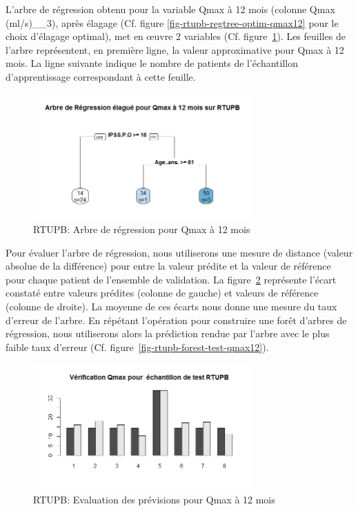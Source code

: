 L'arbre de régression obtenu pour la variable Qmax à 12 mois (colonne Qmax (ml/s)\_\_3), après élagage (Cf. figure \ref{fig-rtupb-regtree-optim-qmax12} pour le choix d'élagage optimal), met en {\oe}uvre 2 variables (Cf. figure~\ref{fig-rtupb-regtree-qmax12}). Les feuilles de l'arbre représentent, en première ligne, la valeur approximative pour Qmax à 12 mois. La ligne suivante indique le nombre de patients de l'échantillon d'apprentissage correspondant à cette feuille. 

\begin{figure}[H]
\centering
\includegraphics[width=0.75\textwidth]{../Fig/RTUPB/rtupb-regtree-qmax12.png}
\caption{RTUPB: Arbre de régression pour Qmax à 12 mois}
\label{fig-rtupb-regtree-qmax12}
\end{figure}

Pour évaluer l'arbre de régression, nous utiliserons une mesure de distance (valeur absolue de la différence) pour entre la valeur prédite et la valeur de référence pour chaque patient de l'ensemble de validation. 
La figure~\ref{fig-rtupb-regtree-test-qmax12} représente l'écart constaté entre valeurs prédites (colonne de gauche) et valeurs de référence (colonne de droite). La moyenne de ces écarts nous donne une mesure du taux d'erreur de l'arbre. En répétant l'opération pour construire une forêt d'arbres de régression, nous utiliserons alors la prédiction rendue par l'arbre avec le plus faible taux d'erreur (Cf. figure~\ref{fig-rtupb-forest-test-qmax12}).

\begin{figure}[H]
\centering
\includegraphics[width=0.75\textwidth]{../Fig/RTUPB/rtupb-regtree-test-qmax12.png}
\caption{RTUPB: Evaluation des prévisions pour Qmax à 12 mois}
\label{fig-rtupb-regtree-test-qmax12}
\end{figure}

